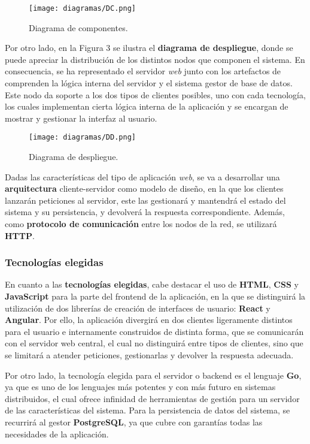 \documentclass[11pt, a4paper, titlepage]{article}
\begin{document}
\begin{figure}[h!]
    \centering
    \texttt{[image: diagramas/DC.png]}
    \caption{Diagrama de componentes.}
\end{figure}


Por otro lado, en la Figura 3 se ilustra el \textbf{diagrama de despliegue}, donde se puede apreciar la distribución de los distintos nodos que componen el sistema. En consecuencia, se ha representado el servidor \textit{web} junto con los artefactos de comprenden la lógica interna del servidor y el sistema gestor de base de datos. Este nodo da soporte a los dos tipos de clientes posibles, uno con cada tecnología, los cuales implementan cierta lógica interna de la aplicación y se encargan de mostrar y gestionar la interfaz al usuario. 

\begin{figure}[h!]
    \centering
    \texttt{[image: diagramas/DD.png]}
    \caption{Diagrama de despliegue.}
\end{figure}

Dadas las características del tipo de aplicación \textit{web}, se va a desarrollar una \textbf{arquitectura} cliente-servidor como modelo de diseño, en la que los clientes lanzarán peticiones al servidor, este las gestionará y mantendrá el estado del sistema y su persistencia, y devolverá la respuesta correspondiente. Además, como \textbf{protocolo de comunicación} entre los nodos de la red, se utilizará \textbf{HTTP}.

\subsubsection{Tecnologías elegidas}

En cuanto a las \textbf{tecnologías elegidas}, cabe destacar el uso de \textbf{HTML}, \textbf{CSS} y \textbf{JavaScript} para la parte del frontend de la aplicación, en la que se distinguirá la utilización de dos librerías de creación de interfaces de usuario: \textbf{React} y \textbf{Angular}. Por ello, la aplicación divergirá en dos clientes ligeramente distintos para el usuario e internamente construidos de distinta forma, que se comunicarán con el servidor web central, el cual no distinguirá entre tipos de clientes, sino que se limitará a atender peticiones, gestionarlas y devolver la respuesta adecuada. \newline

Por otro lado, la tecnología elegida para el servidor o backend es el lenguaje \textbf{Go}, ya que es uno de los lenguajes más potentes y con más futuro en sistemas distribuidos, el cual ofrece infinidad de herramientas de gestión para un servidor de las características del sistema. Para la persistencia de datos del sistema, se recurrirá al gestor \textbf{PostgreSQL}, ya que cubre con garantías todas las necesidades de la aplicación. \newline
\end{document}
